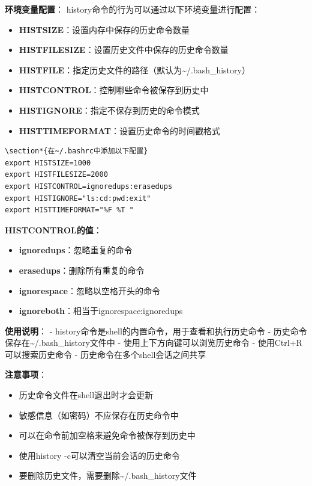 \documentclass[12pt,UTF8]{ctexbook}
\begin{document}
\textbf{环境变量配置}：
history命令的行为可以通过以下环境变量进行配置：

\begin{itemize}
    \item \textbf{HISTSIZE}：设置内存中保存的历史命令数量
    \item \textbf{HISTFILESIZE}：设置历史文件中保存的历史命令数量
    \item \textbf{HISTFILE}：指定历史文件的路径（默认为\textasciitilde/.bash\_history）
    \item \textbf{HISTCONTROL}：控制哪些命令被保存到历史中
    \item \textbf{HISTIGNORE}：指定不保存到历史的命令模式
    \item \textbf{HISTTIMEFORMAT}：设置历史命令的时间戳格式
\end{itemize}

\begin{verbatim}
\section*{在~/.bashrc中添加以下配置}
export HISTSIZE=1000
export HISTFILESIZE=2000
export HISTCONTROL=ignoredups:erasedups
export HISTIGNORE="ls:cd:pwd:exit"
export HISTTIMEFORMAT="%F %T "
\end{verbatim}

\textbf{HISTCONTROL的值}：
\begin{itemize}
    \item \textbf{ignoredups}：忽略重复的命令
    \item \textbf{erasedups}：删除所有重复的命令
    \item \textbf{ignorespace}：忽略以空格开头的命令
    \item \textbf{ignoreboth}：相当于ignorespace:ignoredups
\end{itemize}

\textbf{使用说明}：
- history命令是shell的内置命令，用于查看和执行历史命令
- 历史命令保存在\textasciitilde/.bash\_history文件中
- 使用上下方向键可以浏览历史命令
- 使用Ctrl+R可以搜索历史命令
- 历史命令在多个shell会话之间共享

\textbf{注意事项}：
\begin{itemize}
    \item 历史命令文件在shell退出时才会更新
    \item 敏感信息（如密码）不应保存在历史命令中
    \item 可以在命令前加空格来避免命令被保存到历史中
    \item 使用history -c可以清空当前会话的历史命令
    \item 要删除历史文件，需要删除\textasciitilde/.bash\_history文件
\end{itemize}
\end{document}
